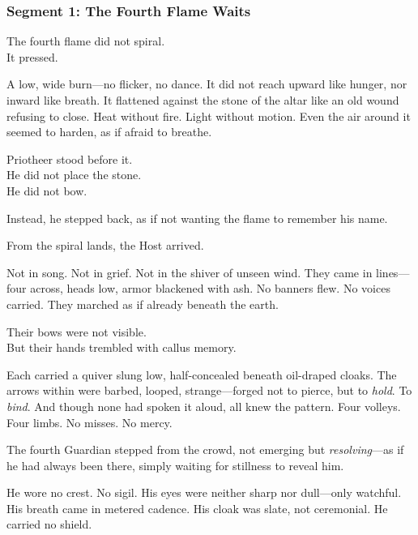 \documentclass[9pt]{article}
\begin{document}
\newpage

\subsubsection*{Segment 1: The Fourth Flame Waits}

The fourth flame did not spiral.\\
It pressed.

\vspace{0.5em}
A low, wide burn---no flicker, no dance. It did not reach upward like hunger, nor inward like breath. It flattened against the stone of the altar like an old wound refusing to close. Heat without fire. Light without motion. Even the air around it seemed to harden, as if afraid to breathe.

\vspace{0.5em}
Priotheer stood before it.\\
He did not place the stone.\\
He did not bow.

\vspace{0.5em}
Instead, he stepped back, as if not wanting the flame to remember his name.

\vspace{0.5em}
From the spiral lands, the Host arrived.

\vspace{0.5em}
Not in song. Not in grief. Not in the shiver of unseen wind. They came in lines---four across, heads low, armor blackened with ash. No banners flew. No voices carried. They marched as if already beneath the earth.

\vspace{0.5em}
Their bows were not visible.\\
But their hands trembled with callus memory.

\vspace{0.5em}
Each carried a quiver slung low, half-concealed beneath oil-draped cloaks. The arrows within were barbed, looped, strange---forged not to pierce, but to \textit{hold}. To \textit{bind}. And though none had spoken it aloud, all knew the pattern. Four volleys. Four limbs. No misses. No mercy.

\vspace{0.5em}
The fourth Guardian stepped from the crowd, not emerging but \textit{resolving}---as if he had always been there, simply waiting for stillness to reveal him.

\vspace{0.5em}
He wore no crest. No sigil. His eyes were neither sharp nor dull---only watchful. His breath came in metered cadence. His cloak was slate, not ceremonial. He carried no shield.
\end{document}
